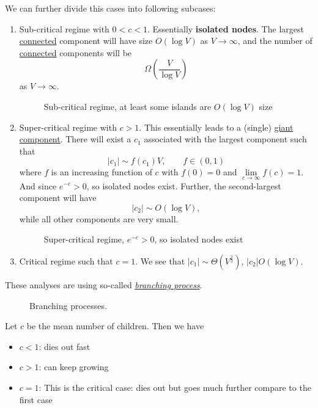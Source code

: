 \begin{remark}
	We can further divide this cases into following subcases:
	\begin{enumerate}
		\item Sub-critical regime with \(0<c<1\). Essentially \textbf{isolated nodes}.
		      The largest \hyperref[def:connected]{connected} component will have size \(O(\log V)\) as \(V\to \infty \), and the
		      number of \hyperref[def:connected]{connected} components will be
		      \[
			      \Omega\left(\frac{V}{\log V}\right)
		      \]
		      as \(V\to \infty \).
		      \begin{figure}[H]
			      \centering
			      \caption{Sub-critical regime, at least some islands are \(O(\log V)\) size}
			      \label{fig:sub-critical-regime}
		      \end{figure}
		\item Super-critical regime with \(c>1\). This essentially leads to a (single) \hyperref[def:giant-component]{giant component}.
		      There will exist a \(c_1\) associated with the largest component such that
		      \[
			      \left\vert c_1 \right\vert \sim f(c_1)V, \qquad f\in(0, 1)
		      \]
		      where \(f\) is an increasing function of \(c\) with \(f(0) = 0\) and \(\lim\limits_{c\to \infty }f(c) = 1\).
		      And since \(e^{-c}>0\), so isolated nodes exist. Further, the second-largest component will have
		      \[
			      \left\vert c_2 \right\vert \sim O(\log V),
		      \]
		      while all other components are very small.
		      \begin{figure}[H]
			      \centering
			      \caption{Super-critical regime, \(e^{-c}>0\), so isolated nodes exist}
			      \label{fig:super-critical-regime}
		      \end{figure}
		\item Critical regime such that \(c = 1\). We see that \(\left\vert c_1 \right\vert \sim \Theta(V^{\frac{2}{3}})\), \(\left\vert c_2 \right\vert O(\log V)\).
	\end{enumerate}
	\begin{remark}
		These analyses are using so-called \href{https://en.wikipedia.org/wiki/Branching_process}{\emph{branching process}}.
		\begin{figure}[H]
			\centering
			\caption{Branching processes.}
			\label{fig:branching-processes}
		\end{figure}

		Let \(c\) be the mean number of children. Then we have
		\begin{itemize}
			\item \(c<1\): dies out fast
			\item \(c>1\): can keep growing
			\item \(c=1\): This is the critical case: dies out but goes much further compare to the first case
		\end{itemize}
	\end{remark}
\end{remark}

